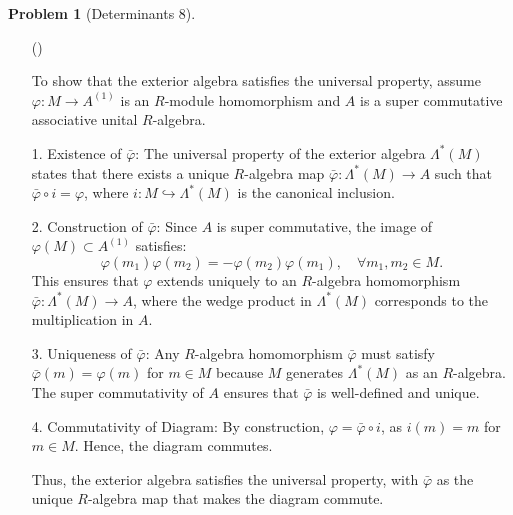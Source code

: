 \documentclass[12pt]{article}
\theoremstyle{definition}
\newtheorem{problem}{Problem}
\newcounter{subq}[problem]
\newenvironment{subproblem}
{\refstepcounter{subq} \begin{itemize} \item[(\alph{subq})]}
{\end{itemize} \medskip}
\begin{document}
\begin{problem}[Determinants 8]
\begin{subproblem}
        \begin{solution}
            To show that the exterior algebra satisfies the universal property, assume \( \varphi : M \to A^{(1)} \) is an \( R \)-module homomorphism and \( A \) is a super commutative associative unital \( R \)-algebra. 

            1. Existence of \( \bar{\varphi} \):  
            The universal property of the exterior algebra \( \Lambda^*(M) \) states that there exists a unique \( R \)-algebra map \( \bar{\varphi} : \Lambda^*(M) \to A \) such that \( \bar{\varphi} \circ i = \varphi \), where \( i: M \hookrightarrow \Lambda^*(M) \) is the canonical inclusion.

            2. Construction of \( \bar{\varphi} \):  
            Since \( A \) is super commutative, the image of \( \varphi(M) \subset A^{(1)} \) satisfies:
            \[
            \varphi(m_1) \varphi(m_2) = -\varphi(m_2) \varphi(m_1), \quad \forall m_1, m_2 \in M.
            \]
            This ensures that \( \varphi \) extends uniquely to an \( R \)-algebra homomorphism \( \bar{\varphi} : \Lambda^*(M) \to A \), where the wedge product in \( \Lambda^*(M) \) corresponds to the multiplication in \( A \).

            3. Uniqueness of \( \bar{\varphi} \):  
            Any \( R \)-algebra homomorphism \( \bar{\varphi} \) must satisfy \( \bar{\varphi}(m) = \varphi(m) \) for \( m \in M \) because \( M \) generates \( \Lambda^*(M) \) as an \( R \)-algebra. The super commutativity of \( A \) ensures that \( \bar{\varphi} \) is well-defined and unique.

            4. Commutativity of Diagram:  
            By construction, \( \varphi = \bar{\varphi} \circ i \), as \( i(m) = m \) for \( m \in M \). Hence, the diagram commutes.

            Thus, the exterior algebra satisfies the universal property, with \( \bar{\varphi} \) as the unique \( R \)-algebra map that makes the diagram commute.
        \end{solution}
    \end{subproblem}
\end{problem}
\end{document}
